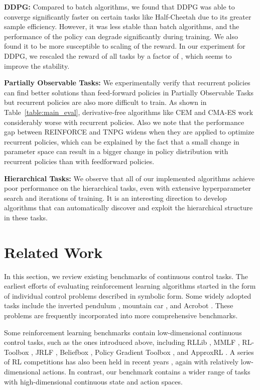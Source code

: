 \documentclass{article}
\begin{document}
{\bf DDPG:} Compared to batch algorithms, we found that DDPG was able to converge significantly faster on certain tasks like Half-Cheetah due to its greater sample efficiency. However, it was less stable than batch algorithms, and the performance of the policy can degrade significantly during training. We also found it to be more susceptible to scaling of the reward. In our experiment for DDPG, we rescaled the reward of all tasks by a factor of , which seems to improve the stability.




{\bf Partially Observable Tasks:} We experimentally verify that recurrent policies can find better solutions than feed-forward policies in Partially Observable Tasks but recurrent policies are also more difficult to train. As shown in Table~\ref{table:main_eval}, derivative-free algorithms like CEM and CMA-ES work considerably worse with recurrent policies. Also we note that the performance gap between REINFORCE and TNPG widens when they are applied to optimize recurrent policies, which can be explained by the fact that a small change in parameter space can result in a bigger change in policy distribution with recurrent policies than with feedforward policies.

{\bf Hierarchical Tasks:} We observe that all of our implemented algorithms achieve poor performance on the hierarchical tasks, even with extensive hyperparameter search and  iterations of training. It is an interesting direction to develop algorithms that can automatically discover and exploit the hierarchical structure in these tasks.





\section{Related Work}
\label{section:related_work}

In this section, we review existing benchmarks of continuous control tasks. The earliest efforts of evaluating reinforcement learning algorithms started in the form of individual control problems described in symbolic form. Some widely adopted tasks include the inverted pendulum \cite{stephenson1908xx, donaldson1960error, widrow1964pattern}, mountain car \cite{Moore90MountainCar}, and Acrobot \cite{dejong1994swinging}.
These problems are frequently incorporated into more comprehensive benchmarks.

Some reinforcement learning benchmarks contain low-dimensional continuous control tasks, such as the ones introduced above, including RLLib \cite{RLLibCapital}, MMLF \cite{MMLF}, RL-Toolbox \cite{RLToolbox},
JRLF \cite{JRLF},
Beliefbox \cite{BeliefBox}, Policy Gradient Toolbox \cite{PolicyGradientToolbox}, and ApproxRL \cite{ApproxRL}. A series of RL competitions has also been held in recent years \cite{dutech2005reinforcement, dimitrakakis2014reinforcement}, again with relatively low-dimensional actions. In contrast, our benchmark contains a wider range of tasks with high-dimensional continuous state and action spaces.
\end{document}
